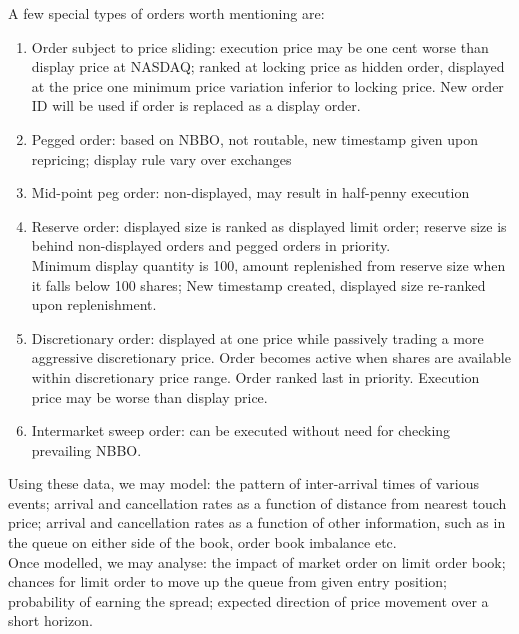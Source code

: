 \begin{enumerate}[label=\roman*.]
\begin{enumerate}[label=\arabic*.]
\end{enumerate}
A few special types of orders worth mentioning are:
\begin{enumerate}[label=\arabic*.]
\setlength{\itemsep}{0pt}
\item Order subject to price sliding: execution price may be one cent worse than display price at NASDAQ; ranked at locking price as hidden order, displayed at the price one minimum price variation inferior to locking price. New order ID will be used if order is replaced as a display order.
\item Pegged order: based on NBBO, not routable, new timestamp given upon repricing; display rule vary over exchanges
\item Mid-point peg order: non-displayed, may result in half-penny execution
\item Reserve order: displayed size is ranked as displayed limit order; reserve size is behind non-displayed orders and pegged orders in priority.\\
Minimum display quantity is 100, amount replenished from reserve size when it falls below 100 shares; New timestamp created, displayed size re-ranked upon replenishment.
\item Discretionary order: displayed at one price while passively trading a more aggressive discretionary price. Order becomes active when shares are available within discretionary price range. Order ranked last in priority. Execution price may be worse than display price.
\item Intermarket sweep order: can be executed without need for checking prevailing NBBO. 
\end{enumerate}
Using these data, we may model: the pattern of inter-arrival times of various events; arrival and cancellation rates as a function of distance from nearest touch price; arrival and cancellation rates as a function of other information, such as in the queue on either side of the book, order book imbalance etc.\\
Once modelled, we may analyse: the impact of market order on limit order book; chances for limit order to move up the queue from given entry position; probability of earning the spread; expected direction of price movement over a short horizon.
\end{enumerate}

